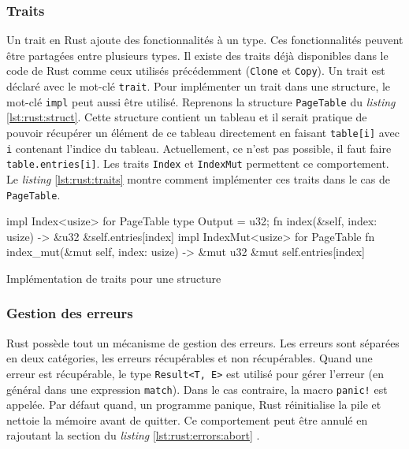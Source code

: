 
\subsubsection{Traits}
Un trait en Rust ajoute des fonctionnalités à un type.
Ces fonctionnalités peuvent être partagées entre plusieurs types. Il existe des
traits déjà disponibles dans le code de Rust comme ceux
utilisés précédemment (\texttt{Clone} et \texttt{Copy}).
Un trait est déclaré avec le mot-clé \texttt{trait}. Pour implémenter
un trait dans une structure, le mot-clé \texttt{impl} peut aussi
être utilisé. Reprenons la structure \texttt{PageTable} du \textit{listing}
\ref{lst:rust:struct}. Cette structure contient un tableau et il serait pratique
de pouvoir récupérer un élément de ce tableau directement en faisant
\texttt{table[i]} avec \texttt{i} contenant l'indice du tableau.
Actuellement, ce n'est pas possible, il faut faire \texttt{table.entries[i]}.
Les traits \texttt{Index} et \texttt{IndexMut} permettent
ce comportement. Le \textit{listing} \ref{lst:rust:traits} montre comment implémenter
ces traits dans le cas de \texttt{PageTable}.

\begin{code}
\begin{rustcode}
impl Index<usize> for PageTable {
    type Output = u32;
    fn index(&self, index: usize) -> &u32 {
        &self.entries[index]
    }
}
impl IndexMut<usize> for PageTable {
    fn index_mut(&mut self, index: usize) -> &mut u32 {
        &mut self.entries[index]
    }
}
\end{rustcode}
\caption{Implémentation de traits pour une structure}
\label{lst:rust:traits}
\end{code}


\subsubsection{Gestion des erreurs}
Rust possède tout un mécanisme de gestion des erreurs. Les erreurs sont séparées
en deux catégories, les erreurs récupérables et non récupérables. Quand une erreur
est récupérable, le type \texttt{Result<T, E>} est utilisé pour gérer
l'erreur (en général dans une expression \texttt{match}). Dans le cas
contraire, la macro \texttt{panic!} est appelée. Par défaut quand, un
programme panique, Rust réinitialise la pile et nettoie la mémoire avant de quitter.
Ce comportement peut être annulé en rajoutant la section du \textit{listing}
\ref{lst:rust:errors:abort} \cite{ref2}.

